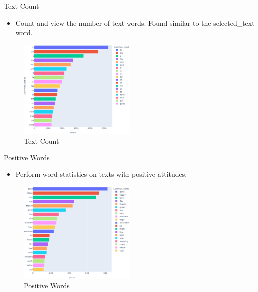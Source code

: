 \documentclass[
 size=14pt,
 paper=smartboard,  %
 mode=present, 		%
 display=slides, 	%
 style=tuliplab,  	%
 pauseslide,
 fleqn,leqno]{powerdot}
\begin{document}
\begin{slide}{Text Count}
  \begin{itemize}
    \item Count and view the number of text words. Found similar to the selected_text word.
  \end{itemize}
  \begin{figure}[htbp]
    \centering
    \includegraphics[width=0.5\textwidth]{figures//text_count_test.eps}
    \caption{Text Count}
  \end{figure}
\end{slide}




\begin{slide}{Positive Words}
  \begin{itemize}
    \item Perform word statistics on texts with positive attitudes.
  \end{itemize}
  \begin{figure}[htbp]
    \centering
    \includegraphics[width=0.5\textwidth]{figures//positive_test.eps}
    \caption{Positive Words}
  \end{figure}
\end{slide}
\end{document}
